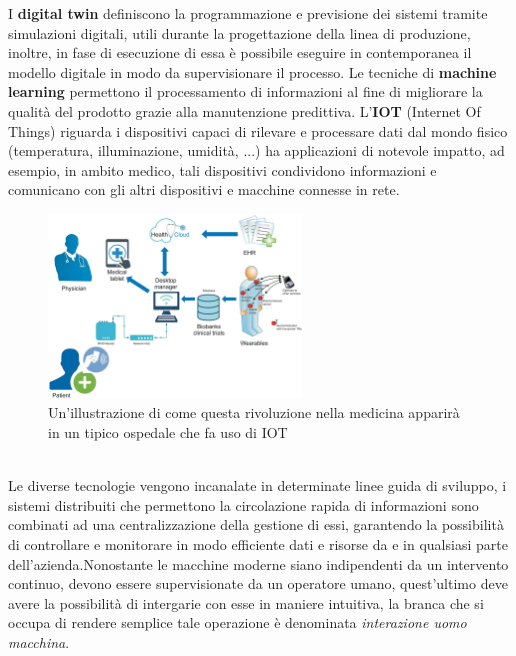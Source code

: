 \documentclass[10pt, letterpaper]{report}
\begin{document}
I \textbf{digital twin} definiscono la programmazione e previsione dei sistemi tramite simulazioni digitali, utili durante la 
progettazione della linea di produzione, inoltre, in fase di esecuzione di essa è possibile eseguire in contemporanea il modello 
digitale in modo da supervisionare il processo.\acc 
Le tecniche di \textbf{machine learning} permettono il processamento di informazioni al fine di migliorare la qualità del 
prodotto grazie alla manutenzione predittiva.\acc 
L'\textbf{IOT} (Internet Of Things) riguarda i dispositivi capaci di rilevare e processare dati 
dal mondo fisico (temperatura,
illuminazione, umidità, ...) ha applicazioni di notevole impatto, ad esempio, in ambito medico, tali dispositivi 
condividono informazioni e comunicano con gli altri dispositivi e macchine connesse in rete.\\\begin{figure}[h!]
    \centering
    \includegraphics[width=0.6\textwidth ]{images/iot.jpg}
    \caption{Un'illustrazione di come questa rivoluzione 
    nella medicina apparirà in un tipico ospedale che fa uso di IOT}
\end{figure}\\
Le diverse tecnologie vengono incanalate in determinate linee guida di sviluppo, i sistemi distribuiti che permettono 
la circolazione rapida di informazioni sono combinati ad una centralizzazione della gestione di essi, garantendo la possibilità 
di controllare e monitorare in modo efficiente dati e risorse da e in qualsiasi parte dell'azienda.\acc Nonostante le 
macchine moderne siano indipendenti da un intervento continuo, devono essere supervisionate da un operatore umano, 
quest'ultimo deve avere la possibilità di intergarie con esse in maniere intuitiva, la branca che si occupa di rendere 
semplice tale operazione è denominata \textit{interazione uomo macchina}.
\end{document}
